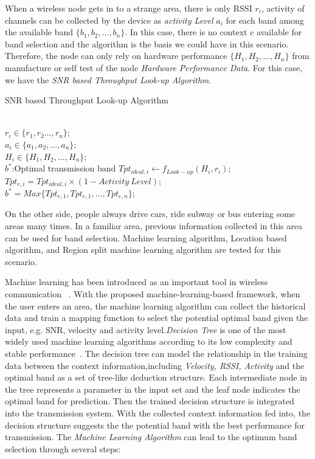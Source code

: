 	  When a wireless node gets in to a strange area, there is only RSSI $r_i$, activity of channels can be collected by the device as \emph{activity Level} $a_i$ for each band among the available band $\{b_1,b_2,\dots,b_n\}$. In this case, there is no context $c$ available for band selection and the algorithm is the basis we could have in this scenario.
	  Therefore, the node can only rely on hardware performance $\{H_1,H_2,\dots,H_n\}$ from manufacture or self test of the node \emph{Hardware Performance Data}. For this case, we have the \emph{SNR based Throughput Look-up Algorithm}.


	  \begin{algorithm}
	  \caption{SNR based Throughput Look-up Algorithm}
	  \label{algorithms: H}
	  \begin{algorithmic}[1]
	  \REQUIRE  ~~\\
		  $r_i \in \{r_1,r_2 \dots,r_n\}$;\\
		  $a_i \in \{a_1,a_2, \dots, a_n\}$;\\
		  $H_i \in \{H_1,H_2,\dots,H_n\}$;
\ENSURE ~~\\    
		  $b^*$:Optimal transmission band
\STATE $Tpt_{ideal,i} \leftarrow f_{Look-up}(H_i,r_i)$;
\STATE  $Tpt_{e,i}=Tpt_{ideal,i}\times(1-Activity \ Level)$;
\ENDFOR \\  
\STATE $b^*=Max\{Tpt_{e,1},Tpt_{e,1},\dots,Tpt_{e,n}\}$;\\
\end{algorithmic}
\end{algorithm}



On the other side, people always drive cars, ride subway or bus entering some areas many times. In a familiar area, previous information collected in this area can be used for band selection. 
Machine learning algorithm, Location based algorithm, and Region split machine learning algorithm are tested for this scenario.

Machine learning has been introduced as an important tool in wireless communication
~\cite{haykin2005cognitive}. With the proposed machine-learning-based framework, when 
the user enters an area, the machine
learning algorithm can collect the historical data and train a mapping 
function to select the potential optimal band given the input, e.g. SNR, velocity 
and activity level.\emph{Decision Tree} is one of the most widely used machine learning 
algorithms according to its low complexity and stable performance~\cite{banfield2007}.
The decision tree can model the relationship in the training data between the context 
information,including \emph{Velocity, RSSI, Activity }  and the optimal band as a set of tree-like deduction structure. Each intermediate
node in the tree represents a parameter in the input set and the leaf node indicates the optimal 
band for prediction. Then the trained decision structure is integrated into the transmission 
system. 
With the collected context information fed into, the decision structure suggests the
the potential band with the best performance for transmission.
The \emph{Machine Learning Algorithm} can lead to the optimum band selection through several steps:


